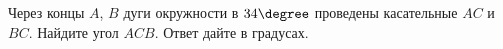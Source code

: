 \begin{ex}
	\begin{condition}
		Через концы \( A \), \( B \)  дуги окружности в \( 34\degree \) проведены касательные \( AC \)  и \( BC \). Найдите угол \( ACB \). Ответ дайте в градусах.
	\end{condition}
\end{ex}